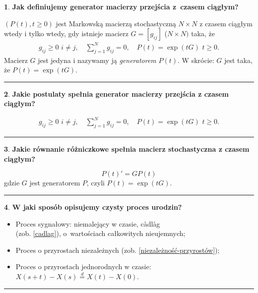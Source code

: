 \documentclass[
    twocolumn,
    twoside,
    fontsize=11pt,
    paper=A0,
    DIV=30
]{scrartcl}
\theoremstyle{definition}
\newtheorem{pytanie}{}
\theoremstyle{break}
\newenvironment{odpowiedź}{\vspace{-0.7em}}{\vspace{0.3em}\hrule}
\begin{document}
\begin{pytanie}
\textbf{Jak definiujemy generator macierzy przejścia z~czasem ciągłym?}
\end{pytanie}
\begin{odpowiedź}
    $(P(t), t\geq 0)$ jest Markowską macierzą stochastyczną
    $N \times N$ z czasem ciągłym wtedy i tylko wtedy,
    gdy istnieje macierz $G= [g_{ij}]$ ($N\times N)$ taka, że
    \begin{gather}
        g_{ij} \geq 0 \,\, i \neq j, \quad
        \sum_{j=1}^N g_{ij} = 0, \quad
        P(t)=\exp(tG) \,\, t\geq 0.
    \end{gather}
    Macierz $G$ jest jedyna i nazywamy ją {\em generatorem} $P(t)$.
    W skrócie: $G$ jest taka, że $P(t) = \exp(tG)$.
\end{odpowiedź}


\begin{pytanie}
\textbf{Jakie postulaty spełnia generator macierzy przejścia z czasem ciągłym?}
\end{pytanie}
\begin{odpowiedź}
    \begin{gather}
        g_{ij} \geq 0 \,\, i \neq j, \quad
        \sum_{j=1}^N g_{ij} = 0, \quad
        P(t)=\exp(tG) \,\, t\geq 0.
    \end{gather}
\end{odpowiedź}


\begin{pytanie}
\textbf{Jakie równanie różniczkowe spełnia macierz stochastyczna z czasem ciągłym?}
\end{pytanie}
\begin{odpowiedź}
    \begin{equation}
        P(t)' = GP(t)
    \end{equation}
    gdzie $G$ jest generatorem $P$, czyli $P(t)=\exp(tG)$.
\end{odpowiedź}


\begin{pytanie}
\textbf{W jaki sposób opisujemy czysty proces urodzin?}
\end{pytanie}
\begin{odpowiedź}
    \begin{itemize}
        \item Proces sygnałowy: niemalejący w czasie, càdlàg\\
              (zob. \ref{cadlag}), o~wartościach całkowitych nieujemnych;
        \item Proces o przyrostach niezależnych (zob. \ref{niezależność-przyrostów});
        \item Proces o przyrostach jednorodnych w czasie:\\
              $X(s+t)-X(s)\overset d = X(t)-X(0)$.
    \end{itemize}
\end{odpowiedź}
\end{document}
